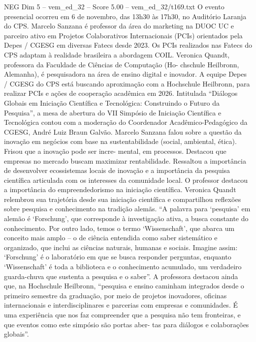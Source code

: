 \begin{textsample}{NEG Dim 5 – vem\_ed\_32 – Score 5.00 – vem\_ed\_32/t169.txt}
O evento presencial ocorreu em 6 de novembro, das 13h30 às 17h30, no Auditório Laranja do CPS.
Marcelo Sanzana é professor da área do marketing na DUOC UC e parceiro ativo em Projetos Colaborativos Internacionais (PCIs) orientados pela Depes / CGESG em diversas Fatecs desde 2023.
Os PCIs realizados nas Fatecs do CPS adaptam à realidade brasileira a abordagem COIL.
Veronica Quandt, professora da Faculdade de Ciências de Computação (Ho- chschule Heilbronn, Alemanha), é pesquisadora na área de ensino digital e inovador.
A equipe Depes / CGESG do CPS está buscando aproximação com a Hochschule Heilbronn, para realizar PCIs e ações de cooperação acadêmica em 2026.
Intitulada “Diálogos Globais em Iniciação Científica e Tecnológica: Construindo o Futuro da Pesquisa”, a mesa de abertura do VII Simpósio de Iniciação Científica e Tecnológica contou com a moderação do Coordenador Acadêmico-Pedagógico da CGESG, André Luiz Braun Galvão.
Marcelo Sanzana falou sobre a questão da inovação em negócios com base na sustentabilidade (social, ambiental, ética).
Frisou que a inovação pode ser incre- mental, em processos.
Destacou que empresas no mercado buscam maximizar rentabilidade.
Ressaltou a importância de desenvolver ecossistemas locais de inovação e a importância da pesquisa científica articulada com os interesses da comunidade local.
O professor destacou a importância do empreendedorismo na iniciação científica.
Veronica Quandt relembrou sua trajetória desde sua iniciação científica e compartilhou reflexões sobre pesquisa e conhecimento na tradição alemãs. “A palavra para ‘pesquisa’ em alemão é ‘Forschung’, que corresponde à investigação ativa, a busca constante do conhecimento.
Por outro lado, temos o termo ‘Wissenschaft’, que abarca um conceito mais amplo – o de ciência entendida como saber sistemático e organizado, que inclui as ciências naturais, humanas e sociais.
Imagine assim: ‘Forschung’ é o laboratório em que se busca responder perguntas, enquanto ‘Wissenschaft’ é toda a biblioteca e o conhecimento acumulado, um verdadeiro guarda-chuva que sustenta a pesquisa e o saber”.
A professora destacou ainda que, na Hochschule Heilbronn, “pesquisa e ensino caminham integrados desde o primeiro semestre da graduação, por meio de projetos inovadores, oficinas internacionais e interdisciplinares e parcerias com empresas e comunidades.
É uma experiência que nos faz compreender que a pesquisa não tem fronteiras, e que eventos como este simpósio são portas aber- tas para diálogos e colaborações globais”.

\end{textsample}
